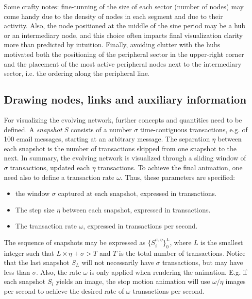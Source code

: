 \documentclass[runningheads]{llncs}
\begin{document}
\noindent Some crafty notes: fine-tunning of the size of each sector (number of nodes) may come handy due to the density of nodes in each segment and due to their activity. Also, the node positioned at the middle of the sine period may be a hub or an intermediary node, and this choice often impacts final visualization clarity more than predicted by intuition.
Finally, 
avoiding clutter with the hubs motivated both 
the positioning of the peripheral sector in the upper-right corner and
the placement of the most active peripheral nodes next to the intermediary sector, i.e. the ordering along the peripheral line.

\subsection{Drawing nodes, links and auxiliary information}
For visualizing the evolving network, further concepts and quantities need to be defined.
A \emph{snapshot} $S$ consists of a number $\sigma$ time-contiguous transactions, e.g. of 100 email messages, starting at an arbitrary message.
The separation $\eta$ between each snapshot is the number of transactions skipped from one snapshot to the next.
In summary, the evolving network is visualized through a sliding window of $\sigma$ transactions, updated each $\eta$ transactions. To achieve the final animation, one need also to define a transaction rate $\omega$.
Thus, these parameters are specified:
\begin{itemize}
  \item the window $\sigma$ captured at each snapshot, expressed in transactions.
  \item The step size $\eta$ between each snapshot, expressed in transactions.
  \item The transaction rate $\omega$, expressed in transactions per second.
\end{itemize}

\noindent The sequence of snapshots may be expressed as $\{S_i^{\sigma, \eta}\}_0^{L}$, where $L$ is the smallest integer such that $L\times \eta + \sigma > T$ and $T$ is the total number of transactions. Notice that the last snapshot $S_L$ will not necessarily have $\sigma$ transactions, but may have less than $\sigma$. Also, the rate $\omega$ is only applied when rendering the animation. E.g. if each snapshot $S_i$ yields an image, the stop motion animation will use $\omega/\eta$ images per second to achieve the desired rate of $\omega$ transactions per second.
\end{document}
